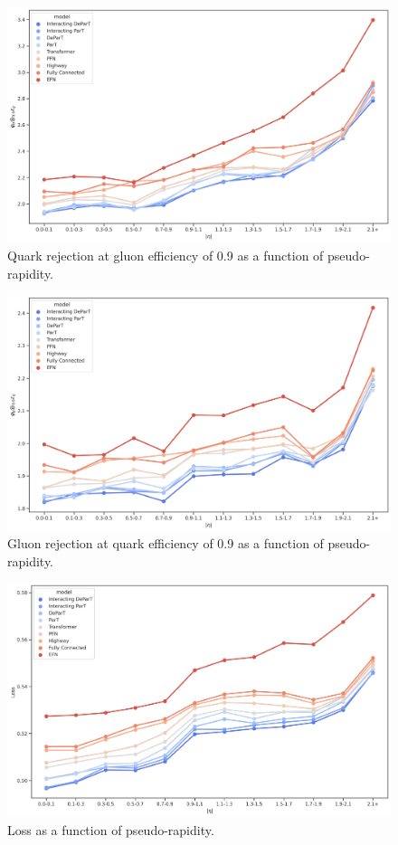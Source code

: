 \begin{figure}[htb]
    \centering
    \includegraphics[width=0.95\linewidth]{src/plots/results/eta_dep/quark_rej_at_gluon_eff_0.9.jpg}
    \caption{Quark rejection at gluon efficiency of 0.9 as a function of pseudo-rapidity.}
    \label{fig:quark_rej_at_gluon_eff_0.9_eta}
\end{figure}

\begin{figure}[htb]
    \centering
    \includegraphics[width=0.95\linewidth]{src/plots/results/eta_dep/gluon_rej_at_quark_eff_0.9.jpg}
    \caption{Gluon rejection at quark efficiency of 0.9 as a function of pseudo-rapidity.}
    \label{fig:gluon_rej_at_quark_eff_0.9_eta}
\end{figure}

\begin{figure}[htb]
    \centering
    \includegraphics[width=0.95\linewidth]{src/plots/results/eta_dep/loss.jpg}
    \caption{Loss as a function of pseudo-rapidity.}
    \label{fig:loss_eta}
\end{figure}

